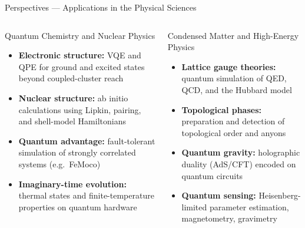 \documentclass[aspectratio=169,12pt]{beamer}
\begin{document}
\begin{frame}{Perspectives --- Applications in the Physical Sciences}
  \begin{columns}[T]
      \begin{block}{Quantum Chemistry and Nuclear Physics}
        \begin{itemize}\small\itemsep1pt
          \item \textbf{Electronic structure:}
                VQE and QPE for ground and excited
                states beyond coupled-cluster reach
          \item \textbf{Nuclear structure:}
                ab initio calculations using Lipkin,
                pairing, and shell-model Hamiltonians
          \item \textbf{Quantum advantage:}
                fault-tolerant simulation of strongly
                correlated systems (e.g.\ FeMoco)
          \item \textbf{Imaginary-time evolution:}
                thermal states and finite-temperature
                properties on quantum hardware
        \end{itemize}
      \end{block}
      \begin{block}{Condensed Matter and High-Energy Physics}
        \begin{itemize}\small\itemsep1pt
          \item \textbf{Lattice gauge theories:}
                quantum simulation of QED, QCD,
                and the Hubbard model
          \item \textbf{Topological phases:}
                preparation and detection of
                topological order and anyons
          \item \textbf{Quantum gravity:}
                holographic duality (AdS/CFT)
                encoded on quantum circuits
          \item \textbf{Quantum sensing:}
                Heisenberg-limited parameter
                estimation, magnetometry,
                gravimetry
        \end{itemize}
      \end{block}
  \end{columns}
\end{frame}
\end{document}
